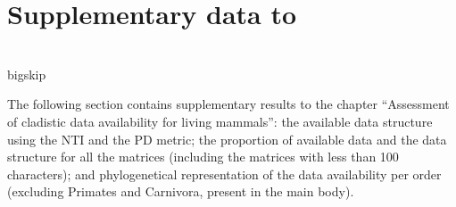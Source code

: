 %
%

\chapter{Supplementary data to }
\label{chap:Appendix_missing_mammals}

\bigskip
\medskip
\begin{center}

 \\
bigskip
\end{center}
%
%
The following section contains supplementary results to the chapter ``Assessment of cladistic data availability for living mammals'': the available data structure using the NTI and the PD metric; the proportion of available data and the data structure for all the matrices (including the matrices with less than 100 characters); and phylogenetical representation of the data availability per order (excluding Primates and Carnivora, present in the main body).



